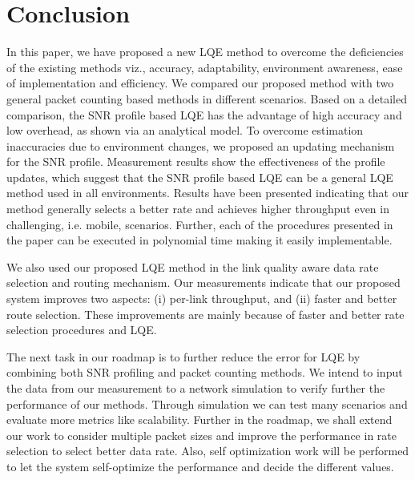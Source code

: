 \documentclass[11pt,draftclsnofoot,journal,onecolumn]{IEEEtran}
\begin{document}
\section{Conclusion}
\label{sec:Conclusion}

In this paper, we have proposed a new LQE method to overcome the deficiencies of the existing methods viz., accuracy, adaptability, environment awareness, ease of implementation and efficiency. We compared our proposed method with two general packet counting based methods in different scenarios. Based on a detailed comparison, the SNR profile based LQE has the advantage of high accuracy and low overhead, as shown via an analytical model. To overcome estimation inaccuracies due to environment changes, we proposed an updating mechanism for the SNR profile. Measurement results show the effectiveness of the profile updates, which suggest that the SNR profile based LQE can be a general LQE method used in all environments. Results have been presented indicating that our method generally selects a better rate and achieves higher throughput even in challenging, i.e. mobile, scenarios. Further, each of the procedures presented in the paper can be executed in polynomial time making it easily implementable.

We also used our proposed LQE method in the link quality aware data rate selection and routing mechanism. Our measurements indicate that our proposed system improves two aspects: (i) per-link throughput, and (ii) faster and better route selection. These improvements are mainly because of faster and better rate selection procedures and LQE.

The next task in our roadmap is to further reduce the error for LQE by combining both SNR profiling and packet counting methods. We intend to input the data from our measurement to a network simulation to verify further the performance of our methods. Through simulation we can test many scenarios and evaluate more metrics like scalability. Further in the roadmap, we shall extend our work to consider multiple packet sizes and improve the performance in rate selection to select better data rate. Also, self optimization work will be performed to let the system self-optimize the performance and decide the different  values.
\end{document}
